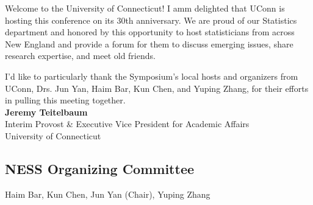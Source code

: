 \newpage

Welcome to the University of Connecticut!  I amm delighted that UConn is
hosting this conference on its 30th anniversary.  We are proud of our
Statistics department and honored by this opportunity to host
statisticians from across New England and provide a forum for them to
discuss emerging issues, share research expertise, and meet old
friends.

I’d like to particularly thank the Symposium’s local hosts and
organizers from UConn, Drs. Jun Yan, Haim Bar, Kun Chen, and Yuping
Zhang, for their efforts in pulling this meeting together. \\[1em]

\textbf{Jeremy Teitelbaum} \\
Interim Provost \& Executive Vice President for Academic Affairs \\
University of Connecticut \\[1em]

\hrulefill

{\centering
  \subsection*{NESS Organizing Committee}

  Haim Bar, Kun Chen, Jun Yan (Chair), Yuping Zhang

}

